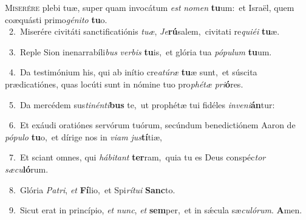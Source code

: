 \lettrine{\initial\textcolor{\initialcolor}{M}}{iserére} plebi tuæ, super quam invocátum \textit{est} \textit{no}\-\textit{men} \textbf{tu}\-um:~\star et Israël, quem coæquásti primo\-\textit{gé}\-\textit{ni}\textit{to} \textbf{tu}\-o.\\
{\numbfont\textcolor{\numbcolor}{~2.}}~Miserére civitáti sanctificatiónis \textit{tu}\-\textit{æ}, \textit{Je}\-\textbf{rú}salem,~\star civitati re\-\textit{qui}\-\textit{é}\textit{i} \textbf{tu}\-æ.\par
{\numbfont\textcolor{\numbcolor}{~3.}}~Reple Sion inenarrabíli\textit{bus} \textit{ver}\-\textit{bis} \textbf{tu}\-is,~\star et glória tua \textit{pó}\-\textit{pu}\textit{lum} \textbf{tu}\-um.\par
{\numbfont\textcolor{\numbcolor}{~4.}}~Da testimónium his, qui ab inítio cre\-\textit{a}\-\textit{tú}\textit{ræ} \textbf{tu}\-æ sunt,~\star et súscita prædicatiónes, quas locúti sunt in nómine tuo pro\-\textit{phé}\-\textit{tæ} \textit{pri}\-\textbf{ó}res.\par
{\numbfont\textcolor{\numbcolor}{~5.}}~Da mercédem sus\-\textit{ti}\-\textit{nén}\textit{ti}\textbf{bus} te,~\star ut prophétæ tui fidéles \textit{in}\-\textit{ve}\textit{ni}\textbf{án}tur:\par
{\numbfont\textcolor{\numbcolor}{~6.}}~Et exáudi oratiónes servórum tuórum, secúndum benedictiónem Aaron de \textit{pó}\-\textit{pu}\textit{lo} \textbf{tu}\-o,~\star et dírige nos in \textit{vi}\-\textit{am} \textit{jus}\-\textbf{tí}tiæ,\par
{\numbfont\textcolor{\numbcolor}{~7.}}~Et sciant omnes, qui \textit{há}\-\textit{bi}\textit{tant} \textbf{ter}\-ram,~\star quia tu es Deus conspéc\textit{tor} \textit{sæ}\-\textit{cu}\textbf{ló}rum.\par
{\numbfont\textcolor{\numbcolor}{~8.}}~Glória \textit{Pa}\-\textit{tri}, \textit{et} \textbf{Fí}\-lio,~\star et Spi\-\textit{rí}\-\textit{tu}\textit{i} \textbf{Sanc}\-to.\par
{\numbfont\textcolor{\numbcolor}{~9.}}~Sicut erat in princípio, \textit{et} \textit{nunc}\-, \textit{et} \textbf{sem}\-per,~\star et in sǽcula sæ\-\textit{cu}\-\textit{ló}\textit{rum}. \textbf{A}\-men.\par
